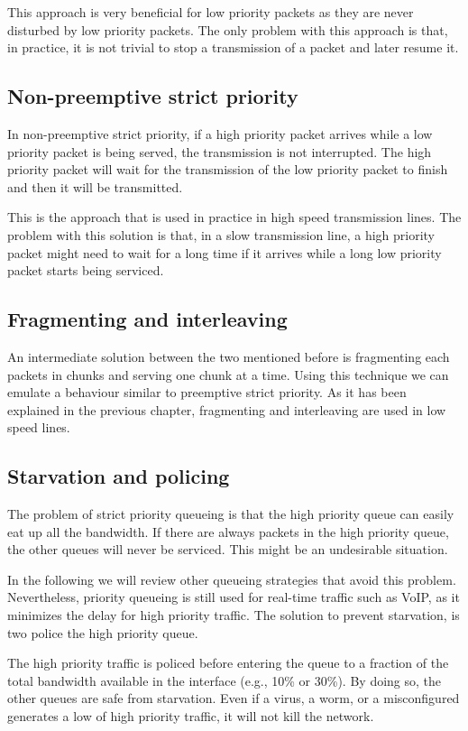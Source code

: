 This approach is very beneficial for low priority packets as they are never disturbed by low priority packets.
The only problem with this approach is that, in practice, it is not trivial to stop a transmission of a packet and later resume it.

\subsection{Non-preemptive strict priority}
In non-preemptive strict priority, if a high priority packet arrives while a low priority packet is being served, the transmission is not interrupted.
The high priority packet will wait for the transmission of the low priority packet to finish and then it will be transmitted.

This is the approach that is used in practice in high speed transmission lines.
The problem with this solution is that, in a slow transmission line, a high priority packet might need to wait for a long time if it arrives while a long low priority packet starts being serviced.

\subsection{Fragmenting and interleaving}
An intermediate solution between the two mentioned before is fragmenting each packets in chunks and serving one chunk at a time. 
Using this technique we can emulate a behaviour similar to preemptive strict priority.
As it has been explained in the previous chapter, fragmenting and interleaving are used in low speed lines.

\subsection{Starvation and policing}
The problem of strict priority queueing is that the high priority queue can easily eat up all the bandwidth.
If there are always packets in the high priority queue, the other queues will never be serviced.
This might be an undesirable situation.

In the following we will review other queueing strategies that avoid this problem.
Nevertheless, priority queueing is still used for real-time traffic such as VoIP, as it minimizes the delay for high priority traffic.
The solution to prevent starvation, is two police the high priority queue.

The high priority traffic is policed before entering the queue to a fraction of the total bandwidth available in the interface (e.g., 10\% or 30\%).
By doing so, the other queues are safe from starvation.
Even if a virus, a worm, or a misconfigured generates a low of high priority traffic, it will not kill the network.

